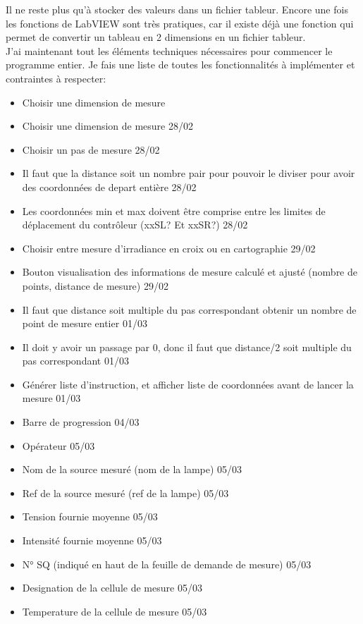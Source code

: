\documentclass[12pt]{article}
\begin{document}
Il ne reste plus qu'à stocker des valeurs dans un fichier tableur.
Encore une fois les fonctions de LabVIEW sont très pratiques, car il existe déjà une fonction qui permet de convertir un tableau en 2 dimensions en un fichier tableur.\\
J'ai maintenant tout les éléments techniques nécessaires pour commencer le programme entier.
Je fais une liste de toutes les fonctionnalités à implémenter et contraintes à respecter:
\begin{itemize}
	\item  Choisir une dimension de mesure
	\item  Choisir une dimension de mesure  28/02
	\item  Choisir un pas de mesure  28/02
	\item  Il faut que la distance soit un nombre pair pour pouvoir le diviser pour avoir des coordonnées de depart entière  28/02
	\item  Les coordonnées min et max doivent être comprise entre les limites de déplacement du contrôleur (xxSL? Et xxSR?)  28/02
	\item  Choisir entre mesure d'irradiance en croix ou en cartographie 29/02
	\item  Bouton visualisation des informations de mesure calculé et ajusté (nombre de points, distance de mesure)  29/02
	\item  Il faut que distance soit multiple du pas correspondant obtenir un nombre de point de mesure entier  01/03
	\item  Il doit y avoir un passage par 0, donc il faut que distance/2 soit multiple du pas correspondant  01/03
	\item  Générer liste d'instruction, et afficher liste de coordonnées avant de lancer la mesure  01/03
	\item  Barre de progression  04/03
	\item  Opérateur  05/03
	\item  Nom de la source mesuré (nom de la lampe)  05/03
	\item  Ref de la source mesuré (ref de la lampe)  05/03
	\item  Tension fournie moyenne  05/03
	\item  Intensité fournie moyenne  05/03
	\item  N° SQ (indiqué en haut de la feuille de demande de mesure)  05/03
	\item  Designation de la cellule de mesure  05/03
	\item  Temperature de la cellule de mesure  05/03

\end{itemize}
\end{document}
